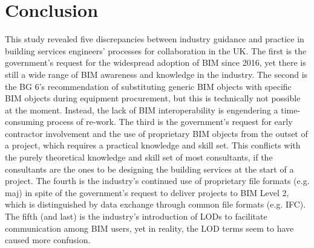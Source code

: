 \chapter{Conclusion} %

\label{Chapter11} %



This study revealed five discrepancies between industry guidance and practice in building services engineers' processes for collaboration in the UK.
The first is the government's request for the widespread adoption of BIM since 2016, yet there is still a wide range of BIM awareness and knowledge in the industry.
The second is the BG 6's recommendation of substituting generic BIM objects with specific BIM objects during equipment procurement, but this is technically not possible at the moment.
Instead, the lack of BIM interoperability is engendering a time-consuming process of re-work. %
The third is the government's request for early contractor involvement and the use of proprietary BIM objects from the outset of a project, which requires a practical knowledge and skill set.
This conflicts with the purely theoretical knowledge and skill set of most consultants, if the consultants are the ones to be designing the building services at the start of a project.
The fourth is the industry's continued use of proprietary file formats (e.g. maj) in spite of the government's request to deliver projects to BIM Level 2, which is distinguished by data exchange through common file formats (e.g. IFC).
The fifth (and last) is the industry's introduction of LODs to facilitate communication among BIM users, yet in reality, the LOD terms seem to have caused more confusion.

